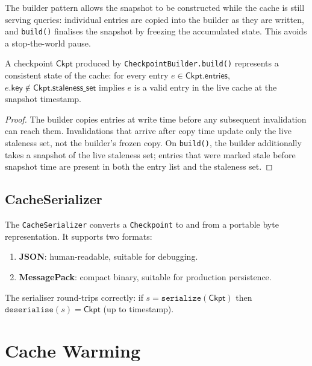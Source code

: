 \documentclass[11pt]{article}
\newcommand{\Checkpoint}{\mathsf{Ckpt}}            %
\begin{document}
The builder pattern allows the snapshot to be constructed while the
cache is still serving queries: individual entries are copied into
the builder as they are written, and \texttt{build()} finalises the
snapshot by freezing the accumulated state.  This avoids a
stop-the-world pause.

\begin{proposition}\label{prop:ckpt-consistent}
A checkpoint $\Checkpoint$ produced by \texttt{CheckpointBuilder.build()}
represents a consistent state of the cache: for every entry
$e \in \Checkpoint.\mathsf{entries}$,
$e.\mathsf{key} \notin \Checkpoint.\mathsf{staleness\_set}$
implies $e$ is a valid entry in the live cache at the snapshot
timestamp.
\end{proposition}
\begin{proof}
The builder copies entries at write time before any subsequent
invalidation can reach them.  Invalidations that arrive after copy
time update only the live staleness set, not the builder's frozen copy.
On \texttt{build()}, the builder additionally takes a snapshot of the
live staleness set; entries that were marked stale before snapshot
time are present in both the entry list and the staleness set.
\end{proof}

\subsection{CacheSerializer}

The \texttt{CacheSerializer} converts a \texttt{Checkpoint} to and from
a portable byte representation.  It supports two formats:
\begin{enumerate}[label=(\roman*)]
\item \textbf{JSON}: human-readable, suitable for debugging.
\item \textbf{MessagePack}: compact binary, suitable for production
  persistence.
\end{enumerate}

The serialiser round-trips correctly: if $s = \mathtt{serialize}(\Checkpoint)$
then $\mathtt{deserialise}(s) = \Checkpoint$ (up to timestamp).

\section{Cache Warming}\label{sec:warming}
\end{document}

